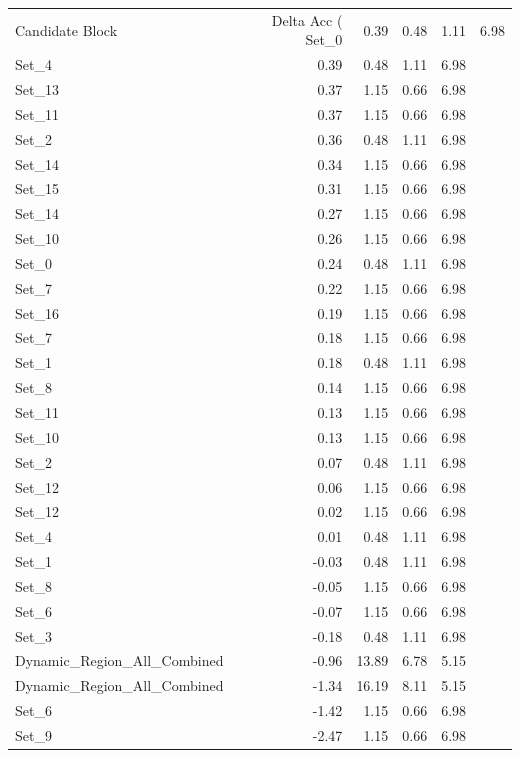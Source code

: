 \begin{tabular}{lrrrr}
\toprule
Candidate Block & Delta Acc (%
\midrule
Set_0 & 0.39 & 0.48 & 1.11 & 6.98 \\
Set_4 & 0.39 & 0.48 & 1.11 & 6.98 \\
Set_13 & 0.37 & 1.15 & 0.66 & 6.98 \\
Set_11 & 0.37 & 1.15 & 0.66 & 6.98 \\
Set_2 & 0.36 & 0.48 & 1.11 & 6.98 \\
Set_14 & 0.34 & 1.15 & 0.66 & 6.98 \\
Set_15 & 0.31 & 1.15 & 0.66 & 6.98 \\
Set_14 & 0.27 & 1.15 & 0.66 & 6.98 \\
Set_10 & 0.26 & 1.15 & 0.66 & 6.98 \\
Set_0 & 0.24 & 0.48 & 1.11 & 6.98 \\
Set_7 & 0.22 & 1.15 & 0.66 & 6.98 \\
Set_16 & 0.19 & 1.15 & 0.66 & 6.98 \\
Set_7 & 0.18 & 1.15 & 0.66 & 6.98 \\
Set_1 & 0.18 & 0.48 & 1.11 & 6.98 \\
Set_8 & 0.14 & 1.15 & 0.66 & 6.98 \\
Set_11 & 0.13 & 1.15 & 0.66 & 6.98 \\
Set_10 & 0.13 & 1.15 & 0.66 & 6.98 \\
Set_2 & 0.07 & 0.48 & 1.11 & 6.98 \\
Set_12 & 0.06 & 1.15 & 0.66 & 6.98 \\
Set_12 & 0.02 & 1.15 & 0.66 & 6.98 \\
Set_4 & 0.01 & 0.48 & 1.11 & 6.98 \\
Set_1 & -0.03 & 0.48 & 1.11 & 6.98 \\
Set_8 & -0.05 & 1.15 & 0.66 & 6.98 \\
Set_6 & -0.07 & 1.15 & 0.66 & 6.98 \\
Set_3 & -0.18 & 0.48 & 1.11 & 6.98 \\
Dynamic_Region_All_Combined & -0.96 & 13.89 & 6.78 & 5.15 \\
Dynamic_Region_All_Combined & -1.34 & 16.19 & 8.11 & 5.15 \\
Set_6 & -1.42 & 1.15 & 0.66 & 6.98 \\
Set_9 & -2.47 & 1.15 & 0.66 & 6.98 \\
\bottomrule
\end{tabular}
